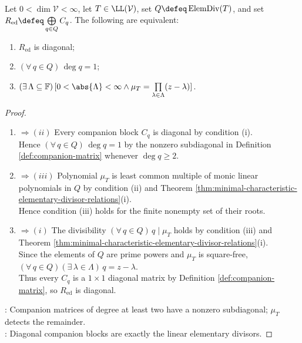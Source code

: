 \begin{corollary} \label{cor:diagonal-rational-canonical-form-criterion} \\
Let $0<\dim\mathcal{V}<\infty$, let $T\in\LL(\mathcal{V})$, set $Q\defeq\operatorname{ElemDiv}(T)$, and set $R_{\operatorname{ed}}\defeq\bigoplus\limits_{q\in Q}C_q$. The following are equivalent:
\begin{enumerate}[label=(\roman*)]
\setlength{\itemsep}{0pt}
\item $R_{\operatorname{ed}}$ is diagonal;
\item $(\forall\,q\in Q)\,\deg q=1$;
\item $(\exists\,\Lambda\subseteq\mathbb{F})\,[0<\abs{\Lambda}<\infty\land\mu_T=\prod\limits_{\lambda\in\Lambda}(z-\lambda)]$.
\end{enumerate}
\begin{proof}
\begin{enumerate}[label=(\roman*)]
\setlength{\itemsep}{0pt}
\item[$(i)$] $\Rightarrow (ii)$ Every companion block $C_q$ is diagonal by condition (i).\\
Hence $(\forall\,q\in Q)\,\deg q=1$ by the nonzero subdiagonal in Definition \ref{def:companion-matrix} whenever $\deg q\geq2$.
\item[$(ii)$] $\Rightarrow (iii)$ Polynomial $\mu_T$ is least common multiple of monic linear polynomials in $Q$ by condition (ii) and Theorem \ref{thm:minimal-characteristic-elementary-divisor-relations}(i).\\
Hence condition (iii) holds for the finite nonempty set of their roots.
\item[$(iii)$] $\Rightarrow (i)$ The divisibility $(\forall\,q\in Q)\,q\mid\mu_T$ holds by condition (iii) and Theorem \ref{thm:minimal-characteristic-elementary-divisor-relations}(i).\\
Since the elements of $Q$ are prime powers and $\mu_T$ is square-free, $(\forall\,q\in Q)(\exists\,\lambda\in\Lambda)\,q=z-\lambda$.\\
Thus every $C_q$ is a $1\times1$ diagonal matrix by Definition \ref{def:companion-matrix}, so $R_{\operatorname{ed}}$ is diagonal.
\end{enumerate}
: Companion matrices of degree at least two have a nonzero subdiagonal; $\mu_T$ detects the remainder.\\
: Diagonal companion blocks are exactly the linear elementary divisors.
\end{proof}
\end{corollary}

